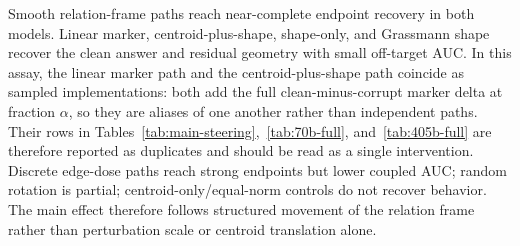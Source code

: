 \documentclass[11pt]{article}
\begin{document}
Smooth relation-frame paths reach near-complete endpoint recovery in both models. Linear marker, centroid-plus-shape, shape-only, and Grassmann shape recover the clean answer and residual geometry with small off-target AUC. In this assay, the linear marker path and the centroid-plus-shape path coincide as sampled implementations: both add the full clean-minus-corrupt marker delta at fraction $\alpha$, so they are aliases of one another rather than independent paths. Their rows in Tables~\ref{tab:main-steering},~\ref{tab:70b-full}, and~\ref{tab:405b-full} are therefore reported as duplicates and should be read as a single intervention. Discrete edge-dose paths reach strong endpoints but lower coupled AUC; random rotation is partial; centroid-only/equal-norm controls do not recover behavior. The main effect therefore follows structured movement of the relation frame rather than perturbation scale or centroid translation alone.
\end{document}
